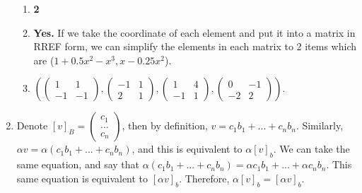 \documentclass{article}
\begin{document}
\begin{enumerate}
\begin{enumerate}
\item \textbf{2}

\item \textbf{Yes.} If we take the coordinate of each element and put it into a matrix in RREF form, we can simplify the elements in each matrix to 2 items which are ($1 + 0.5x^2 - x^3, x - 0.25x^2$).

\item $\left( \left(\begin{array}{cc} 1 & 1 \\ -1 & -1 \end{array}\right), \left(\begin{array}{cc} -1 & 1 \\ 2 & 1 \end{array}\right), \left(\begin{array}{cc} 1 & 4 \\ -1 & 1 \end{array}\right), \left(\begin{array}{cc} 0 & -1 \\ -2 & 2 \end{array}\right)\right)$.

\end{enumerate}

\item Denote $[v]_B = \left(\begin{array}{c} c_1 \\ ... \\ c_n \end{array}\right)$, then by definition, $v = c_1 b_1 + ... + c_n b_n$. Similarly, $\alpha v = \alpha (c_1 b_1 + ... + c_n b_n)$, and this is equivalent to $\alpha [v]_b$. We can take the same equation, and say that $\alpha (c_1 b_1 + ... + c_n b_n) = \alpha c_1 b_1 + ... + \alpha c_n b_n$. This same equation is equivalent to $[\alpha v]_b$. Therefore, $\alpha [v]_b = [\alpha v]_b$.


\end{enumerate}
\end{document}
